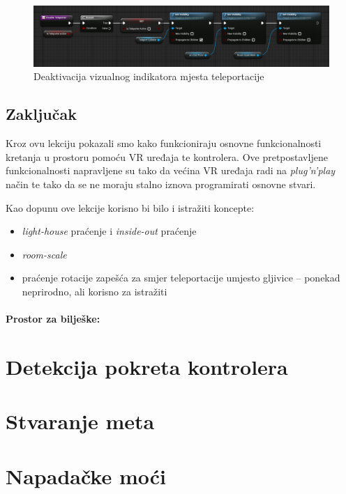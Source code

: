 \documentclass[a4paper,10pt]{article}
\begin{document}
\begin{figure}[!h]
	\centering
	\includegraphics[width=\textwidth]{slike/14.png}
	\caption{Deaktivacija vizualnog indikatora mjesta teleportacije}
\end{figure}


\subsection{Zaključak}

Kroz ovu lekciju pokazali smo kako funkcioniraju osnovne funkcionalnosti
kretanja u prostoru pomoću VR uređaja te kontrolera. Ove pretpostavljene
funkcionalnosti napravljene su tako da većina VR uređaja radi na
\textit{plug'n'play} način te tako da se ne moraju stalno iznova programirati
osnovne stvari.

Kao dopunu ove lekcije korisno bi bilo i istražiti koncepte:
\begin{itemize}
	\item \textit{light-house} praćenje i \textit{inside-out} praćenje
	\item \textit{room-scale}
	\item praćenje rotacije zapešća za smjer teleportacije umjesto gljivice
		-- ponekad neprirodno, ali korisno za istražiti
\end{itemize}
\paragraph{Prostor za bilješke:}\phantom{}


\pagebreak
\section{Detekcija pokreta kontrolera}

\pagebreak
\section{Stvaranje meta}

\pagebreak
\section{Napadačke moći}
\end{document}
